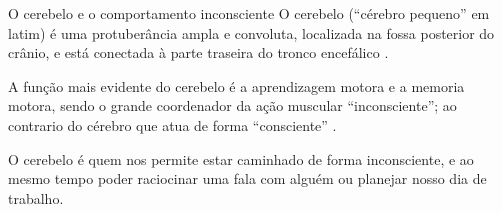 \begin{elaboracion}{O cerebelo e o comportamento inconsciente}
O cerebelo (``cérebro pequeno'' em latim) é uma protuberância ampla e convoluta,
localizada na fossa posterior do crânio, 
e está conectada à parte traseira do tronco encefálico \cite[pp. 93]{gazzanigaciencia} \cite[pp. 87]{carneiro2004atlas}
\cite[pp. 516]{bearneurociencias}.

A função mais evidente do cerebelo é a aprendizagem motora e a memoria motora,
sendo o grande coordenador da ação muscular ``inconsciente'';
ao contrario do cérebro que atua de forma ``consciente'' 
\cite[pp. 93]{gazzanigaciencia} \cite[pp. 87]{carneiro2004atlas} \cite[pp. 516]{bearneurociencias}.

O cerebelo é quem nos permite estar caminhado de forma inconsciente,
e ao mesmo tempo poder raciocinar uma fala com alguém ou planejar nosso dia de trabalho.
\end{elaboracion}
